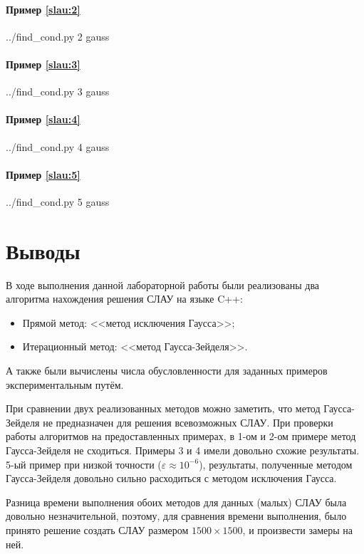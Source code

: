 \documentclass[a4paper]{article}
\begin{document}
\paragraph{Пример \eqref{slau:2}}
\bash[stdout]
../find_cond.py 2 gauss
\END

\paragraph{Пример \eqref{slau:3}}
\bash[stdout]
../find_cond.py 3 gauss
\END

\paragraph{Пример \eqref{slau:4}}
\bash[stdout]
../find_cond.py 4 gauss
\END

\paragraph{Пример \eqref{slau:5}}
\bash[stdout]
../find_cond.py 5 gauss
\END

\break

\section{Выводы}
В ходе выполнения данной лабораторной работы были реализованы два алгоритма нахождения решения СЛАУ на языке C++:
\begin{itemize}
    \item Прямой метод: <<метод исключения Гаусса>>;
    \item Итерационный метод: <<метод Гаусса-Зейделя>>.
\end{itemize}
А также были вычислены числа обусловленности для заданных примеров экспериментальным путём.

\bigskip

При сравнении двух реализованных методов можно заметить, что метод Гаусса-Зейделя не предназначен для решения всевозможных СЛАУ.
При проверки работы алгоритмов на предоставленных примерах, в 1-ом и 2-ом примере метод Гаусса-Зейделя не сходиться. Примеры 3 и 4 имели довольно схожие результаты.
5-ый пример при низкой точности ($\varepsilon \approx 10^{-6}$), результаты, полученные методом Гаусса-Зейделя довольно сильно расходиться с методом исключения Гаусса. 

\bigskip

Разница времени выполнения обоих методов для данных (малых) СЛАУ была довольно незначительной, поэтому, для сравнения времени выполнения, было принято решение создать СЛАУ размером $1500 \times 1500$, и произвести замеры на ней.
\end{document}
